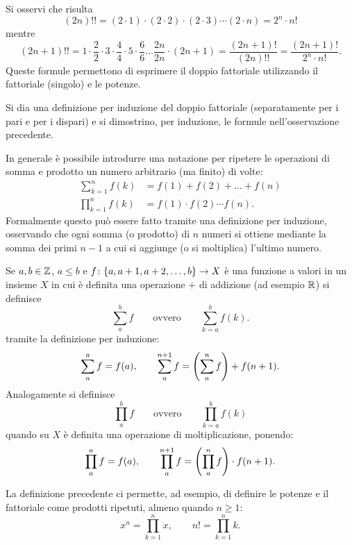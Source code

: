 \begin{remark}
Si osservi che risulta
\[
  (2n)!! = (2\cdot 1) \cdot (2\cdot 2) \cdot (2\cdot 3) \cdots (2\cdot n)
        = 2^n \cdot n!
\]
mentre
\[
  (2n+1)!! = 1 \cdot \frac{2}{2} \cdot 3 \cdot \frac{4}{4}
\cdot 5 \cdot \frac{6}{6} \dots \frac{2n}{2n} \cdot (2n+1)
= \frac{(2n+1)!}{(2n)!!}
 = \frac{(2n+1)!}{2^n \cdot n!}.
\]
Queste formule permettono di esprimere il doppio fattoriale utilizzando
il fattoriale (singolo) e le potenze.
\end{remark}

\begin{exercise}
Si dia una definizione per induzione del doppio fattoriale
(separatamente per i pari e per i dispari)
e si dimostrino, per induzione, le formule nell'osservazione precedente.
\end{exercise}

In generale è possibile introdurre una notazione per ripetere le operazioni
di somma e prodotto un numero arbitrario (ma finito) di volte:
\begin{align*}
  \sum_{k=1}^n f(k) &= f(1) + f(2) + \dots + f(n) \\
  \prod_{k=1}^n f(k) &= f(1) \cdot f(2) \cdots f(n).
\end{align*}
Formalmente questo può essere fatto tramite una definizione per induzione,
osservando che ogni somma (o prodotto) di $n$ numeri si ottiene mediante
la somma dei primi $n-1$ a cui si aggiunge (o si moltiplica) l'ultimo numero.

\begin{definition}
\label{def:sommatoria}%
%
Se $a,b\in \mathbb Z$, $a\le b$ e $f\colon {\left\{ a, a+1, a+2, \dots, b \right\}}\to X$
è una funzione a valori in un insieme $X$ in cui è definita una
operazione $+$ di addizione (ad esempio $\mathbb R$)
si definisce
\[
  \sum_a^b f
  \qquad \text{ovvero} \qquad
  \sum_{k=a}^b f(k).
\]
tramite la definizione per induzione:
\[
    \displaystyle \sum_a^a f = f(a), \qquad
    \displaystyle \sum_{a}^{n+1} f = {\left( \sum_a^n f \right)} + f(n+1).
\]
Analogamente si definisce
\[
  \prod_a^b f
  \qquad\text{ovvero}\qquad
  \prod_{k=a}^b f(k)
\]
quando su $X$ è definita una operazione di moltiplicazione,
ponendo:
\[
    \displaystyle \prod_{a}^a f = f(a), \qquad
    \displaystyle \prod_{a}^{n+1} f = {\left( \prod_a^n f \right)} \cdot f(n+1).
\]
\end{definition}

La definizione precedente ci permette, ad esempio, di definire le potenze e il fattoriale
come prodotti ripetuti, almeno quando $n\ge 1$:
\[
  x^n = \prod_{k=1}^n x, \qquad
  n! = \prod_{k=1}^n k.
\]

